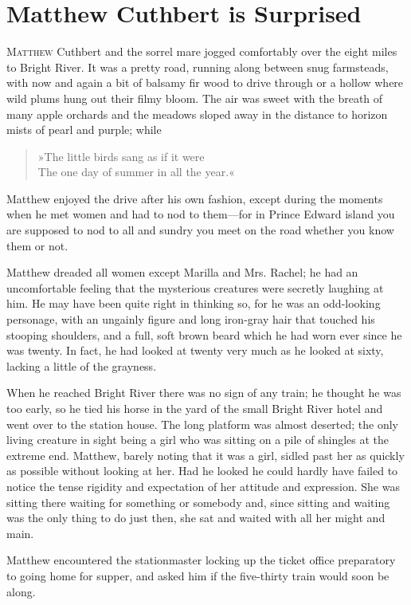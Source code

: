 \chapter{Matthew Cuthbert is Surprised}

\lettrine[lines=4]{M}{atthew} Cuthbert and the sorrel mare jogged comfortably over the eight miles to Bright River. It was a pretty road, running along between snug farmsteads, with now and again a bit of balsamy fir wood to drive through or a hollow where wild plums hung out their filmy bloom. The air was sweet with the breath of many apple orchards and the meadows sloped away in the distance to horizon mists of pearl and purple; while

\begin{verse}
»The little birds sang as if it were\\
The one day of summer in all the year.«
\end{verse}

Matthew enjoyed the drive after his own fashion, except during the moments when he met women and had to nod to them—for in Prince Edward island you are supposed to nod to all and sundry you meet on the road whether you know them or not.

Matthew dreaded all women except Marilla and Mrs. Rachel; he had an uncomfortable feeling that the mysterious creatures were secretly laughing at him. He may have been quite right in thinking so, for he was an odd-looking personage, with an ungainly figure and long iron-gray hair that touched his stooping shoulders, and a full, soft brown beard which he had worn ever since he was twenty. In fact, he had looked at twenty very much as he looked at sixty, lacking a little of the grayness.

When he reached Bright River there was no sign of any train; he thought he was too early, so he tied his horse in the yard of the small Bright River hotel and went over to the station house. The long platform was almost deserted; the only living creature in sight being a girl who was sitting on a pile of shingles at the extreme end. Matthew, barely noting that it was a girl, sidled past her as quickly as possible without looking at her. Had he looked he could hardly have failed to notice the tense rigidity and expectation of her attitude and expression. She was sitting there waiting for something or somebody and, since sitting and waiting was the only thing to do just then, she sat and waited with all her might and main.

Matthew encountered the stationmaster locking up the ticket office preparatory to going home for supper, and asked him if the five-thirty train would soon be along.

